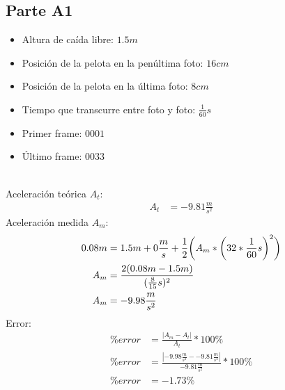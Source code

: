\subsection{Parte A1}%
\label{sub:parte_a1}

\begin{itemize}
	\item Altura de caída libre: $1.5m$
	\item Posición de la pelota en la penúltima foto: $16cm$
	\item Posición de la pelota en la última foto: $8cm$
	\item Tiempo que transcurre entre foto y foto: $ \frac{1}{60} s$
\end{itemize}
\hfill
\begin{itemize}
	\item Primer frame: $0001$
	\item Último frame: $0033$
\end{itemize}
\hfill\\
Aceleración teórica $A_t$:
\begin{align*}
	A_t &= -9.81 \frac{m}{s^2}
\end{align*}
Aceleración medida $A_m$:
\begin{align*}
	0.08m &= 1.5m + 0 \frac{m}{s} + \frac{1}{2}\bigg{(}A_m * \bigg{(}32* \frac{1}{60} s\bigg{)}^2\bigg{)} \\
	A_m &= \frac{2(0.08m - 1.5m)}{( \frac{8}{15}s)^2} \\
	A_m &= -9.98 \frac{m}{s^2}
\end{align*}
Error:
\begin{align*}
	\% error &= \frac{|A_m - A_t|}{A_t} * 100 \% \\
	\% error &= \frac{|-9.98 \frac{m}{s^2}--9.81 \frac{m}{s^2}|}{-9.81 \frac{m}{s^2}} * 100 \% \\
	\% error &= -1.73\%
\end{align*}
